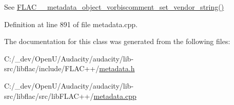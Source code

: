 See \hyperlink{group__flac__metadata__object_gabfc6277c08a86329efd19572695b57e6}{F\+L\+A\+C\+\_\+\+\_\+metadata\+\_\+object\+\_\+vorbiscomment\+\_\+set\+\_\+vendor\+\_\+string()} 



Definition at line 891 of file metadata.\+cpp.



The documentation for this class was generated from the following files\+:\begin{DoxyCompactItemize}
\item 
C\+:/\+\_\+dev/\+Open\+U/\+Audacity/audacity/lib-\/src/libflac/include/\+F\+L\+A\+C++/\hyperlink{include_2_f_l_a_c_09_09_2metadata_8h}{metadata.\+h}\item 
C\+:/\+\_\+dev/\+Open\+U/\+Audacity/audacity/lib-\/src/libflac/src/lib\+F\+L\+A\+C++/\hyperlink{lib_f_l_a_c_09_09_2metadata_8cpp}{metadata.\+cpp}\end{DoxyCompactItemize}
